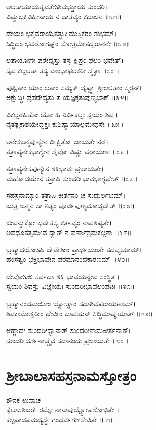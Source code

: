 ಅಲಸಾಯಾಯತ್ನವತೇऽಶಿವಭಕ್ತಾಯ ಸುಂದರಿ।\\
ವಿಷ್ಣುಭಕ್ತಿವಿಹೀನಾಯ ನ ದಾತವ್ಯಂ ಕದಾಚನ ॥೩೧॥

ದೇಯಂ ಭಕ್ತವರಾಯೈತತ್ಭುಕ್ತಿಮುಕ್ತಿಕರಂ ಶುಭಮ್।\\
ಸಿದ್ಧಿದಂ ಭವರೋಗಘ್ನಂ ಸ್ತೋತ್ರಮೇತದ್ವರಾನನೇ ॥೩೨॥

ಲತಾಯೋಗೇ ಪಠೇದ್ಯಸ್ತು ತಸ್ಯ ಕ್ಷಿಪ್ರಂ ಫಲಂ ಭವೇತ್।\\
ಸೈವ ಕಲ್ಪಲತಾ ತಸ್ಯ ವಾಂಛಾಫಲಕರೀ ಸ್ಮೃತಾ ॥೩೩॥

ಪುಷ್ಪಿತಾಂ ಯಾಂ ಲತಾಂ ಸಮ್ಯಕ್ ದೃಷ್ಟ್ವಾ ಶ್ರೀಲಲಿತಾಂ ಸ್ಮರನ್।\\
ಅಕ್ಷುಬ್ಧಃ ಪ್ರಪಠೇದ್ಯಸ್ತು ಸ ಯಜ್ಞಕ್ರತುಪುಣ್ಯಭಾಕ್ ॥೩೪॥

ವಿಕಲ್ಪರಹಿತೋ ಯೋ ಹಿ ನಿರ್ವಿಕಲ್ಪಃ ಸ್ವಯಂ ಶಿವಃ।\\
ನೈತತ್ಪ್ರಕಾಶಯೇದ್ಭಕ್ತಃ ಕುಶಿಷ್ಯಾಯಾಲ್ಪಮೇಧಸೇ ॥೩೫॥

ಅನೇಕಜನ್ಮಪುಣ್ಯೇನ ದೀಕ್ಷಿತೋ ಜಾಯತೇ ನರಃ।\\
ತತ್ರಾಪ್ಯನೇಕಭಾಗ್ಯೇನ ಶೈವೋ ವಿಷ್ಣು ಪರಾಯಣಃ ॥೩೬॥

ತತ್ರಾಪ್ಯನೇಕಪುಣ್ಯೇನ ಶಕ್ತಿಭಾವಃ ಪ್ರಜಾಯತೇ।\\
ಮಹೋದಯೇನ ತತ್ರಾಪಿ ಸುಂದರೀಭಾವಭಾಗ್ಭವೇತ್ ॥೩೭॥

ಸಹಸ್ರನಾಮ್ನಾಂ ತತ್ರಾಪಿ ಕೀರ್ತನಂ ಚ ಸುದುರ್ಲಭಮ್।\\
ಯತ್ರ ಜನ್ಮನಿ ಸಾ ನಿತ್ಯಂ ಪೂರ್ವಪುಣ್ಯವಶಾದ್ಭವೇತ್ ॥೩೮॥

ಜೀವನ್ಮುಕ್ತೋ ಭವೇತ್ತಸ್ಯ ಕರ್ತವ್ಯಂ ನಾವಶಿಷ್ಯತೇ।\\
ಅವಧೂತತ್ವಮೇವ ಸ್ಯಾತ್ ನ ವರ್ಣಾಶ್ರಮಕಲ್ಪನಾ ॥೩೯॥

ಬ್ರಹ್ಮಾದಯೋऽಪಿ ದೇವೇಶೀಂ ಪ್ರಾರ್ಥಯಂತೇ ತದವ್ಯಯಾಮ್।\\
ಹಂಸತ್ವಂ ಭಕ್ತಿಭಾವೇನ ಪರಮಾನಂದಕಾರಣಮ್ ॥೪೦॥

ದೇವೋऽಸೌ ಸರ್ವದಾ ಶಕ್ತಿ ಭಾವಯನ್ನೇವ ಸಂಸ್ಥಿತಃ।\\
ಸ್ವಯಂ ಶಿವಸ್ತು ವಿಜ್ಞೇಯಃ ಸುಂದರೀಭಾವಲಂಪಟಃ ॥೪೧॥

ಬ್ರಹ್ಮಾನಂದಮಯೀಂ ಜ್ಯೋತ್ಸ್ನಾಂ ಸದಾಶಿವಪರಾಯಣಾಮ್।\\
ಶಿವಕಾಮೇಶ್ವರೀಂ ದೇವೀಂ ಭಾವಯನ್ ಸಿದ್ಧಿಮಾಪ್ನುಯಾತ್ ॥೪೨॥

ಆಹ್ಲಾದಃ ಸುಂದರೀಧ್ಯಾನಾತ್ ಸುಂದರೀನಾಮಕೀರ್ತನಾತ್।\\
ಸುಂದರೀದರ್ಶನಾಚ್ಚೈವ ಸದಾನಂದಃ ಪ್ರಜಾಯತೇ ॥೪೩॥
\section{ಶ್ರೀಬಾಲಾಸಹಸ್ರನಾಮಸ್ತೋತ್ರಂ }
ಶೌನಕ ಉವಾಚ\\
ಕೈಲಾಸಶಿಖರೇ ರಮ್ಯೇ ನಾನಾಪುಯ್ಷ್ಪೋಪಶೋಭಿತೇ ।\\
ಕಲ್ಪಪಾದಪಮಧ್ಯಸ್ಥೇ ಗಂಧರ್ವಗಣಸೇವಿತೇ ॥ ೧॥


